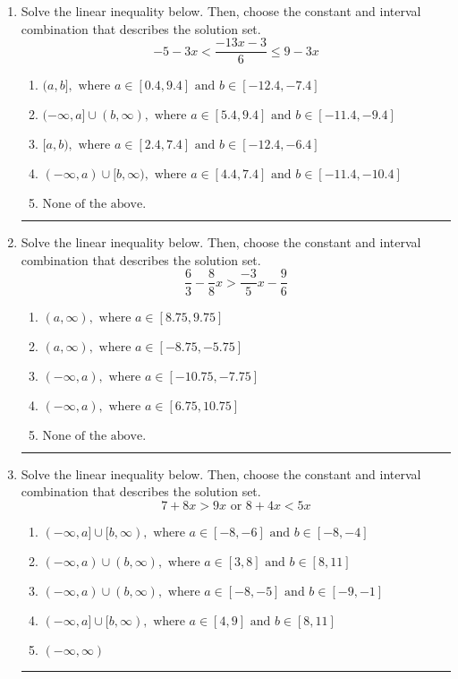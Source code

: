 \documentclass[14pt]{extbook}
\newcommand{\litem}[1]{\item#1\hspace*{-1cm}\rule{\textwidth}{0.4pt}}
\begin{document}
\begin{enumerate}
\litem{
Solve the linear inequality below. Then, choose the constant and interval combination that describes the solution set.\[ -5 - 3 x < \frac{-13 x - 3}{6} \leq 9 - 3 x \]\begin{enumerate}[label=\Alph*.]
\item \( (a, b], \text{ where } a \in [0.4, 9.4] \text{ and } b \in [-12.4, -7.4] \)
\item \( (-\infty, a] \cup (b, \infty), \text{ where } a \in [5.4, 9.4] \text{ and } b \in [-11.4, -9.4] \)
\item \( [a, b), \text{ where } a \in [2.4, 7.4] \text{ and } b \in [-12.4, -6.4] \)
\item \( (-\infty, a) \cup [b, \infty), \text{ where } a \in [4.4, 7.4] \text{ and } b \in [-11.4, -10.4] \)
\item \( \text{None of the above.} \)

\end{enumerate} }
\litem{
Solve the linear inequality below. Then, choose the constant and interval combination that describes the solution set.\[ \frac{6}{3} - \frac{8}{8} x > \frac{-3}{5} x - \frac{9}{6} \]\begin{enumerate}[label=\Alph*.]
\item \( (a, \infty), \text{ where } a \in [8.75, 9.75] \)
\item \( (a, \infty), \text{ where } a \in [-8.75, -5.75] \)
\item \( (-\infty, a), \text{ where } a \in [-10.75, -7.75] \)
\item \( (-\infty, a), \text{ where } a \in [6.75, 10.75] \)
\item \( \text{None of the above}. \)

\end{enumerate} }
\litem{
Solve the linear inequality below. Then, choose the constant and interval combination that describes the solution set.\[ 7 + 8 x > 9 x \text{ or } 8 + 4 x < 5 x \]\begin{enumerate}[label=\Alph*.]
\item \( (-\infty, a] \cup [b, \infty), \text{ where } a \in [-8, -6] \text{ and } b \in [-8, -4] \)
\item \( (-\infty, a) \cup (b, \infty), \text{ where } a \in [3, 8] \text{ and } b \in [8, 11] \)
\item \( (-\infty, a) \cup (b, \infty), \text{ where } a \in [-8, -5] \text{ and } b \in [-9, -1] \)
\item \( (-\infty, a] \cup [b, \infty), \text{ where } a \in [4, 9] \text{ and } b \in [8, 11] \)
\item \( (-\infty, \infty) \)


\end{enumerate}}
\end{enumerate}
\end{document}
